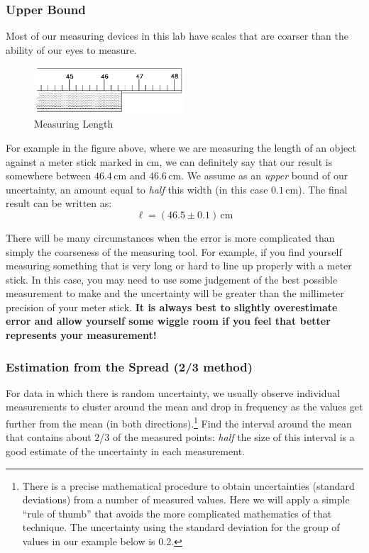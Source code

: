 \subsubsection{Upper Bound}

Most of our measuring devices in this lab have scales that are coarser than the ability of our eyes to measure.

\begin{figure}[h]
    \begin{center}
        \includegraphics[width=0.5\textwidth]{./Exp1-2/pic/image1.png}
    \end{center}
    \caption{Measuring Length}
    \label{fig:measure}
\end{figure}

For example in the figure above, where we are measuring the length of an object against a meter stick marked in cm, we can definitely say that our result is somewhere between $46.4\,\mathrm{cm}$ and $46.6\,\mathrm{cm}$. We assume as an \emph{upper} bound of our uncertainty, an amount equal to \emph{half} this width (in this case $0.1\,\mathrm{cm}$). The final result can be written as:
\begin{equation}
    \ell = (46.5\pm 0.1)\,\mathrm{cm}
\end{equation}

There will be many circumstances when the error is more complicated than simply the coarseness of the measuring tool. For example, if you find yourself measuring something that is very long or hard to line up properly with a meter stick. In this case, you may need to use some judgement of the best possible measurement to make and the uncertainty will be greater than the millimeter precision of your meter stick. \textbf{It is always best to slightly overestimate error and allow yourself some wiggle room if you feel that better represents your measurement!}

\subsubsection{Estimation from the Spread (2/3 method)} \label{sssec:twothirds}

For data in which there is random uncertainty, we usually observe individual measurements to cluster around the mean and drop in frequency as the values get further from the mean (in both directions).\footnote{There is a precise mathematical procedure to obtain uncertainties (standard deviations) from a number of measured values. Here we will apply a simple ``rule of thumb'' that avoids the more complicated mathematics of that technique. The uncertainty using the standard deviation for the group of values in our example below is 0.2.}  Find the interval around the mean that contains about 2/3 of the measured points: \emph{half} the size of this interval is a good estimate of the uncertainty in each measurement. \myskip

